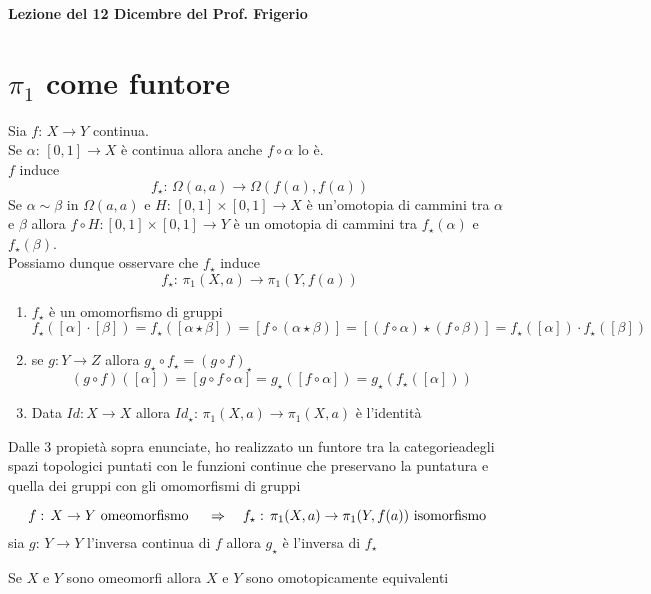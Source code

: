 

\textbf{Lezione del 12 Dicembre del Prof. Frigerio}
\section{$\pi_1$ come funtore}
Sia $f:\, X\to Y$ continua.\\
Se $\alpha:\, [0,1]\to X $ \`e continua allora anche $f \circ \alpha$ lo \`e.\\
$f$ induce $$f_\star:\, \Omega(a,a) \to \Omega(f(a),f(a))$$
Se $\alpha\sim \beta$ in $\Omega(a,a)$ e $H:\, [0,1]\times [0,1]\to X$ \`e un'omotopia di cammini tra $\alpha$ e $ \beta$ allora $f\circ H : [0,1]\times [0,1]\to Y$ \`e un omotopia di cammini tra $f_\star(\alpha)$ e $f_\star(\beta)$.\\
Possiamo dunque osservare che $f_\star$ induce
$$ f_\star:\, \pi_1(X,a) \to \pi_1(Y,f(a))$$
\begin{enumerate}
\item $f_\star$ \`e un omomorfismo di gruppi
$$ f_\star( [\alpha] \cdot [\beta]) =f_\star( [\alpha\star \beta])= [f\circ ( \alpha\star \beta)]= [ ( f\circ \alpha) \star ( f\circ \beta)]=f_\star([\alpha])\cdot f_\star([\beta])$$
\item se $g:Y \to Z $ allora $g_\star \circ f_\star =(g\circ f)_\star$
$$ (g\circ f)([\alpha])= [g\circ f \circ \alpha] = g_\star ([f\circ \alpha])= g_\star \left( f_\star( [\alpha]) \right)$$
\item Data $Id:X\to X$ allora $Id_\star:\, \pi_1(X,a) \to \pi_1(X,a)$ \`e l'identit\`a
\end{enumerate}
Dalle 3 propiet\`a sopra enunciate, ho realizzato un funtore tra la categorieadegli spazi topologici puntati con le funzioni continue che preservano la puntatura e quella dei gruppi con gli omomorfismi di gruppi
\begin{cor}
$$f:\, X \to Y \text{  omeomorfismo } \quad \Rightarrow \quad f_\star :\, \pi_1(X,a) \to \pi_1(Y, f(a))\text{ isomorfismo }$$
\proof sia $g:\, Y \to Y$ l'inversa continua di $f$ allora $g_\star$ \`e l'inversa di $f_\star$
\end{cor}
\begin{oss}Se $X$ e $Y$ sono omeomorfi allora $X$ e $Y$ sono omotopicamente equivalenti
\end{oss}

